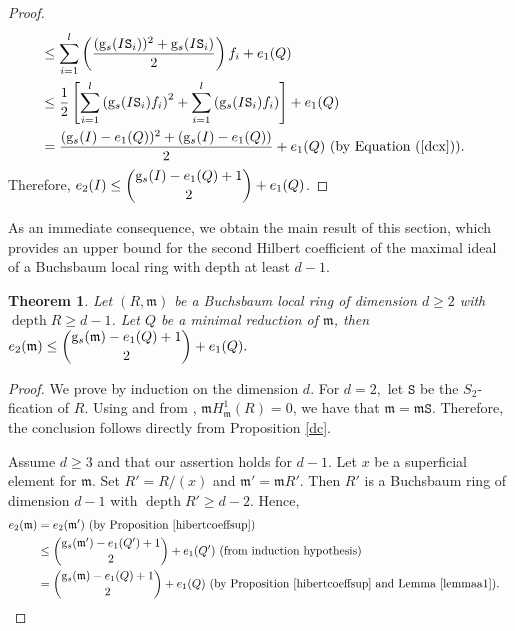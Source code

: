 \documentclass[reqno,a4paper,dvipsnames]{amsart}
\newcommand{\m}{\mathfrak{m} }
\newcommand{\depth}{\operatorname{depth}}
\newtheorem{theorem}{Theorem}[section]
\theoremstyle{definition}
\begin{document}
\begin{proof}
\begin{align*}
& \leq \sum_{i=1}^{l}\left(\frac{(\mathrm{g}_{s}(I\mathtt{S}_{i}))^2+\mathrm{g}_{s}(I\mathtt{S}_{i})}{2}\right)f_{i}+e_{1}(Q) & \\ \nonumber
 & \leq\frac{1}{2}\left[ \sum_{i=1}^{l} \left(\mathrm{g}_{s}(I\mathtt{S}_{i})f_{i}\right)^{2}
 +\sum_{i=1}^{l}\left( \mathrm{g}_{s}(I\mathtt{S}_{i})f_{i}\right)\right]+e_{1}(Q) & \\ \nonumber
& = \frac{(\mathrm{g}_{s}(I)-e_{1}(Q))^{2}+(\mathrm{g}_{s}(I)-e_{1}(Q))}{2}+e_{1}(Q)  \text{ (by Equation (\ref{dcx}))}.
    \end{align*}
    Therefore, $e_{2}(I) \leq \dbinom{\mathrm{g}_{s}(I)-e_{1}(Q)+1}{2}+e_{1}(Q)$.
\end{proof}

As an immediate consequence, we obtain the main result of this section, which provides an upper bound for the second Hilbert coefficient of the maximal ideal of a Buchsbaum local ring with depth at least $d-1$.
\begin{theorem} \label{s2ficationmaximal}
  Let $(R,\m)$ be a Buchsbaum local ring of dimension $d \geq 2$ with $\depth R\geq d-1$. Let $Q$ be a minimal reduction of $\m$, then   $e_{2}(\m) \leq \dbinom{\mathrm{g}_{s}(\m)-e_{1}(Q)+1}{2}+e_{1}(Q).$
\end{theorem}
\begin{proof}
 We prove by induction on the dimension $d.$ For $d=2,$ let $\mathtt{S}$ be the $S_{2}$-fication of $R.$
Using \cite[Proposition 4.1]{gghv}  and  from \cite[Chapter 2, Proposition 2.1 (iii)]{sv}, $\mathfrak{m} H
    ^{1}_{\mathfrak{m}}(R) = 0$, we have that  $\m =\m\mathtt{S}.$ Therefore, the conclusion follows directly from Proposition \ref{dc}.

 Assume $d \geq 3$ and that our assertion holds for $d-1.$  Let $x$ be a superficial element for $\m.$ Set $R'=R/(x)$ and $\m'=\m R'.$ Then $R'$ is a Buchsbaum ring of dimension $d-1$ with $\depth R' \geq d-2.$ Hence,
 \begin{align*}
     e_{2}(\m)
     &=e_{2}(\m')  \text{ (by Proposition \ref{hibertcoeffsup})}\\
     & \leq \dbinom{\mathrm{g}_{s}(\m')-e_{1}(Q')+1}{2}+e_{1}(Q')  \text{ (from induction hypothesis)}\\
     &=\dbinom{\mathrm{g}_{s}(\m)-e_{1}(Q)+1}{2}+e_{1}(Q) \text{ (by Proposition \ref{hibertcoeffsup} and Lemma \ref{lemmaa1}).} &\qedhere
 \end{align*}
\end{proof}
\end{document}

